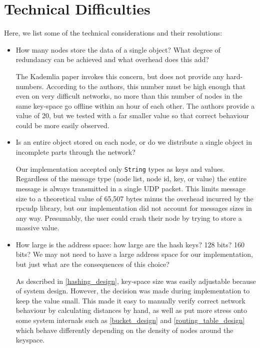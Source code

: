 \documentclass[12pt]{report}
\newcommand{\code}[1]{\colorbox{codegray}{\texttt{#1}}}
\begin{document}
    \section{Technical Difficulties}
    Here, we list some of the technical considerations and their resolutions:
    \begin{itemize}
        \item How many nodes store the data of a single object?  What degree of
            redundancy can be achieved and what overhead does this add?
            
            The Kademlia paper invokes this concern, but does not provide any
            hard-numbers.  According to the authors, this number must be high
            enough that even on very difficult networks, no more than this
            number of nodes in the same key-space go offline within an hour of
            each other.  The authors provide a value of 20, but we tested with
            a far smaller value so that correct behaviour could be more easily
            observed.

        \item Is an entire object stored on each node, or do we distribute a
            single object in incomplete parts through the network?

            Our implementation accepted only \code{String} types as keys and
            values.  Regardless of the message type (node list, node id, key,
            or value) the entire message is always transmitted in a single UDP
            packet.  This limits message size to a theoretical value of 65,507
            bytes minus the overhead incurred by the rpcudp library, but our
            implementation did not account for messages sizes in any way.
            Presumably, the user could crash their node by trying to store a
            massive value.

        \item How large is the address space: how large are the hash keys?  128
            bits?  160 bits?  We may not need to have a large address space for
            our implementation, but just what are the consequences of this
            choice?

            As described in \ref{hashing_design}, key-space size was easily adjustable
            because of system design.  However, the decision was made during
            implementation to keep the value small.  This made it easy to
            manually verify correct network behaviour by calculating distances
            by hand, as well as put more stress onto some system internals such
            as \ref{bucket_design} and \ref{routing_table_design} which behave
            differently depending on the density of nodes around the keyspace.


\end{itemize}
\end{document}
